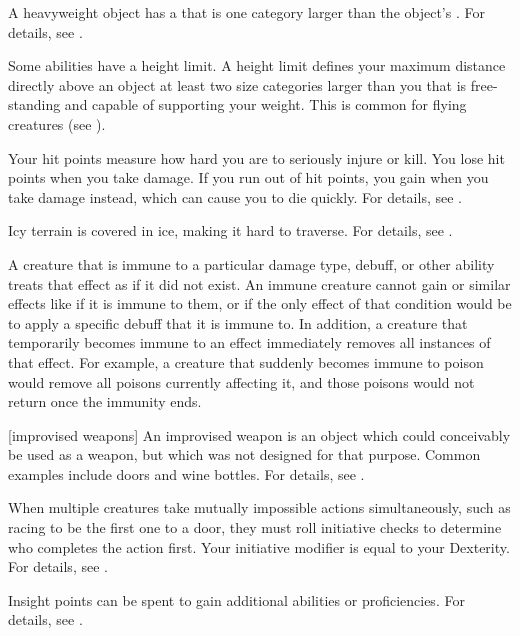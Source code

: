  A heavyweight object has a  that is one category larger than the object's .
For details, see .

 Some abilities have a height limit.
A height limit defines your maximum distance directly above an object at least two size categories larger than you that is free-standing and capable of supporting your weight.
This is common for flying creatures (see ).

 Your hit points measure how hard you are to seriously injure or kill.
You lose hit points when you take damage.
If you run out of hit points, you gain  when you take damage instead, which can cause you to die quickly.
For details, see .

 Icy terrain is covered in ice, making it hard to traverse.
For details, see .

 A creature that is immune to a particular damage type, debuff, or other ability treats that effect as if it did not exist.
An immune creature cannot gain  or similar effects like  if it is immune to them, or if the only effect of that condition would be to apply a specific debuff that it is immune to.
In addition, a creature that temporarily becomes immune to an effect immediately removes all instances of that effect.
For example, a creature that suddenly becomes immune to poison would remove all poisons currently affecting it, and those poisons would not return once the immunity ends.

[improvised weapons] An improvised weapon is an object which could conceivably be used as a weapon, but which was not designed for that purpose.
Common examples include doors and wine bottles.
For details, see .

 When multiple creatures take mutually impossible actions simultaneously, such as racing to be the first one to a door, they must roll initiative checks to determine who completes the action first.
Your initiative modifier is equal to your Dexterity.
For details, see .

 Insight points can be spent to gain additional abilities or proficiencies.
For details, see .

